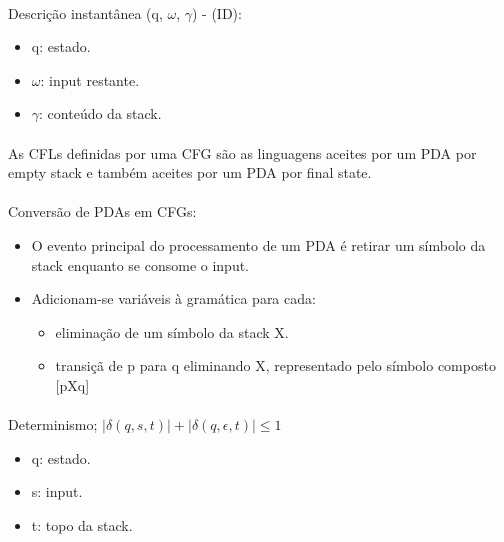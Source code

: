 \documentclass[../resumosTCOM.tex]{subfiles}
\begin{document}
\paragraph{}

Descrição instantânea (q, $\omega$, $\gamma$) - (ID):
\begin{itemize}
    \item q: estado.
    \item $\omega$: input restante.
    \item $\gamma$: conteúdo da stack.
\end{itemize}

\paragraph{}

As CFLs definidas por uma CFG são as linguagens aceites por um PDA por empty stack e também aceites por um PDA por final state.

\paragraph{}

Conversão de PDAs em CFGs:
\begin{itemize}
    \item O evento principal do processamento de um PDA é retirar um símbolo da stack enquanto se consome o input.
    \item Adicionam-se variáveis à gramática para cada:
    \begin{itemize}
        \item eliminação de um símbolo da stack X.
        \item transiçã de p para q eliminando X, representado pelo símbolo composto [pXq]
    \end{itemize}
\end{itemize}

\paragraph{}

Determinismo; \(|\delta(q, s, t)| + |\delta(q, \epsilon, t)| \leq 1\)
\begin{itemize}
    \item q: estado.
    \item s: input.
    \item t: topo da stack.
\end{itemize}
\end{document}

